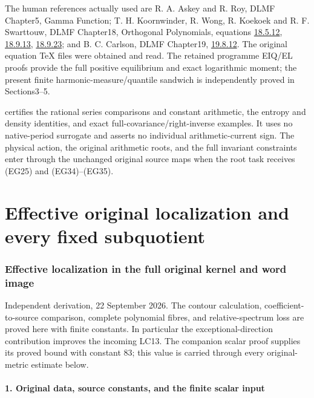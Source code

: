 \documentclass[10pt]{article}
\begin{document}
The human references actually used are R. A. Askey and R. Roy, DLMF Chapter5, Gamma Function; T. H. Koornwinder, R. Wong, R. Koekoek and R. F. Swarttouw, DLMF Chapter18, Orthogonal Polynomials, equations \href{https://dlmf.nist.gov/18.5.E12}{18.5.12}, \href{https://dlmf.nist.gov/18.9.E13}{18.9.13}, \href{https://dlmf.nist.gov/18.9.E23}{18.9.23}; and B. C. Carlson, DLMF Chapter19, \href{https://dlmf.nist.gov/19.8.E12}{19.8.12}. The original equation TeX files were obtained and read. The retained programme EIQ/EL proofs provide the full positive equilibrium and exact logarithmic moment; the present finite harmonic-measure/quantile sandwich is independently proved in Sections3--5.

 certifies the rational series comparisons and constant arithmetic, the entropy and density identities, and exact full-covariance/right-inverse examples. It uses no native-period surrogate and asserts no individual arithmetic-current sign. The physical action, the original arithmetic roots, and the full invariant constraints enter through the unchanged original source maps when the root task receives (EG25) and (EG34)--(EG35).

\clearpage\part{Effective original localization and every fixed subquotient}
\section{Effective localization in the full original kernel and word image}\label{effective-localization-in-the-full-original-kernel-and-word-image}

Independent derivation, 22 September 2026. The contour calculation, coefficient-to-source comparison, complete polynomial fibres, and relative-spectrum loss are proved here with finite constants. In particular the exceptional-direction contribution improves the incoming LC13. The companion scalar proof supplies its proved bound with constant 83; this value is carried through every original-metric estimate below.

\subsection{1. Original data, source constants, and the finite scalar input}\label{original-data-source-constants-and-the-finite-scalar-input}
\end{document}
